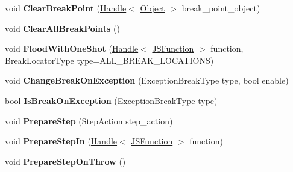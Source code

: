 \begin{DoxyCompactItemize}
\item 
void {\bfseries Clear\+Break\+Point} (\hyperlink{classv8_1_1internal_1_1_handle}{Handle}$<$ \hyperlink{classv8_1_1internal_1_1_object}{Object} $>$ break\+\_\+point\+\_\+object)\hypertarget{classv8_1_1internal_1_1_debug_aa8fadbecef2c2a6f8020c9da58153a38}{}\label{classv8_1_1internal_1_1_debug_aa8fadbecef2c2a6f8020c9da58153a38}

\item 
void {\bfseries Clear\+All\+Break\+Points} ()\hypertarget{classv8_1_1internal_1_1_debug_a324006627d768db3535d7913d469e643}{}\label{classv8_1_1internal_1_1_debug_a324006627d768db3535d7913d469e643}

\item 
void {\bfseries Flood\+With\+One\+Shot} (\hyperlink{classv8_1_1internal_1_1_handle}{Handle}$<$ \hyperlink{classv8_1_1internal_1_1_j_s_function}{J\+S\+Function} $>$ function, Break\+Locator\+Type type=A\+L\+L\+\_\+\+B\+R\+E\+A\+K\+\_\+\+L\+O\+C\+A\+T\+I\+O\+NS)\hypertarget{classv8_1_1internal_1_1_debug_a71262c9aa5bd1950571a24f7166e52c7}{}\label{classv8_1_1internal_1_1_debug_a71262c9aa5bd1950571a24f7166e52c7}

\item 
void {\bfseries Change\+Break\+On\+Exception} (Exception\+Break\+Type type, bool enable)\hypertarget{classv8_1_1internal_1_1_debug_a7bee600841fe83a2dc539856cbfe5ec6}{}\label{classv8_1_1internal_1_1_debug_a7bee600841fe83a2dc539856cbfe5ec6}

\item 
bool {\bfseries Is\+Break\+On\+Exception} (Exception\+Break\+Type type)\hypertarget{classv8_1_1internal_1_1_debug_aea86b5daed3f01383f1a0ee2330a466e}{}\label{classv8_1_1internal_1_1_debug_aea86b5daed3f01383f1a0ee2330a466e}

\item 
void {\bfseries Prepare\+Step} (Step\+Action step\+\_\+action)\hypertarget{classv8_1_1internal_1_1_debug_a1872132362358cdade44b99095d8f97f}{}\label{classv8_1_1internal_1_1_debug_a1872132362358cdade44b99095d8f97f}

\item 
void {\bfseries Prepare\+Step\+In} (\hyperlink{classv8_1_1internal_1_1_handle}{Handle}$<$ \hyperlink{classv8_1_1internal_1_1_j_s_function}{J\+S\+Function} $>$ function)\hypertarget{classv8_1_1internal_1_1_debug_a3dc6802fb68825df1a2322933fd452b2}{}\label{classv8_1_1internal_1_1_debug_a3dc6802fb68825df1a2322933fd452b2}

\item 
void {\bfseries Prepare\+Step\+On\+Throw} ()\hypertarget{classv8_1_1internal_1_1_debug_aca9a11794cd471939698acde5a1ab7d4}{}\label{classv8_1_1internal_1_1_debug_aca9a11794cd471939698acde5a1ab7d4}


\end{DoxyCompactItemize}
